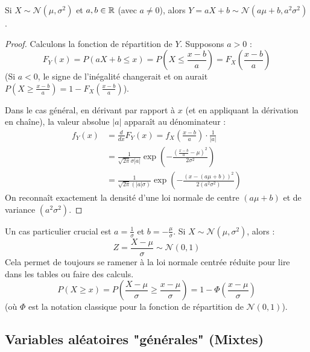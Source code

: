 \begin{proposition}
    Si $X \sim \mathcal{N}(\mu, \sigma^2)$ et $a, b \in \mathbb{R}$ (avec $a \neq 0$), alors $Y = aX+b \sim \mathcal{N}(a\mu + b, a^2\sigma^2)$.
\end{proposition}

\begin{proof}
    Calculons la fonction de répartition de $Y$. Supposons $a > 0$ :
    \[
    F_Y(x) = P(aX+b \le x) = P\left(X \le \frac{x-b}{a}\right) = F_X\left(\frac{x-b}{a}\right)
    \]
    (Si $a < 0$, le signe de l'inégalité changerait et on aurait $P(X \ge \frac{x-b}{a}) = 1 - F_X(\frac{x-b}{a})$).
    
    Dans le cas général, en dérivant par rapport à $x$ (et en appliquant la dérivation en chaîne), la valeur absolue $|a|$ apparaît au dénominateur :
    \begin{align*}
        f_Y(x) &= \frac{d}{dx} F_Y(x) = f_X\left(\frac{x-b}{a}\right) \cdot \frac{1}{|a|} \\
        &= \frac{1}{\sqrt{2\pi}\sigma |a|} \exp\left( -\frac{\left( \frac{x-b}{a} - \mu \right)^2}{2\sigma^2} \right) \\
        &= \frac{1}{\sqrt{2\pi}(|a|\sigma)} \exp\left( -\frac{(x - (a\mu + b))^2}{2(a^2\sigma^2)} \right)
    \end{align*}
    On reconnaît exactement la densité d'une loi normale de centre $(a\mu + b)$ et de variance $(a^2\sigma^2)$.
\end{proof}

\begin{remarque}[Standardisation]
    Un cas particulier crucial est $a = \frac{1}{\sigma}$ et $b = -\frac{\mu}{\sigma}$. Si $X \sim \mathcal{N}(\mu, \sigma^2)$, alors :
    \[
    Z = \frac{X-\mu}{\sigma} \sim \mathcal{N}(0, 1)
    \]
    Cela permet de toujours se ramener à la loi normale centrée réduite pour lire dans les tables ou faire des calculs. 
    \[
    P(X \ge x) = P\left(\frac{X-\mu}{\sigma} \ge \frac{x-\mu}{\sigma}\right) = 1 - \Phi\left(\frac{x-\mu}{\sigma}\right)
    \]
    (où $\Phi$ est la notation classique pour la fonction de répartition de $\mathcal{N}(0,1)$).
\end{remarque}

\subsection{Variables aléatoires "générales" (Mixtes)}

